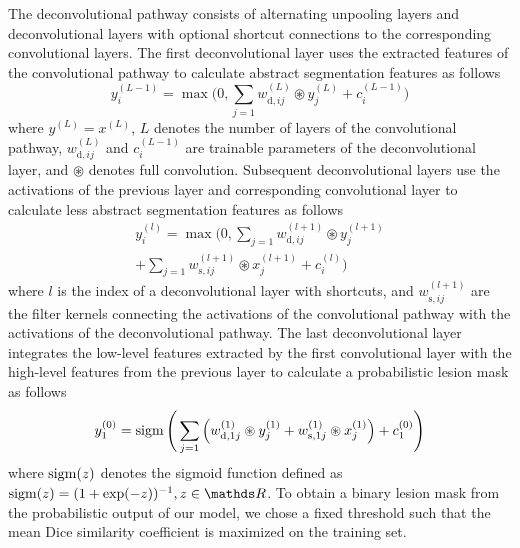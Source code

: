 The deconvolutional pathway consists of alternating unpooling layers and
deconvolutional layers with optional shortcut connections to the corresponding
convolutional layers. The first deconvolutional layer uses the extracted
features of the convolutional pathway to calculate abstract segmentation
features as follows
\begin{equation}
y^{(L-1)}_i = \max\Bigg(0, \sum_{j=1}w^{(L)}_{\text{d},ij}\circledast
y^{(L)}_j + c^{(L-1)}_{i}\Bigg)
\end{equation}
where $y^{(L)} = x^{(L)}$, $L$ denotes the number of layers of the convolutional
pathway, $w^{(L)}_{\text{d},ij}$ and $c^{(L-1)}_i$ are trainable parameters of
the deconvolutional layer, and $\circledast$ denotes full convolution. Subsequent
deconvolutional layers use the activations of the previous layer
and corresponding convolutional layer to calculate less abstract segmentation
features as follows
\begin{multline}
y^{(l)}_i = \max\Bigg(0, 
\sum_{j=1}w^{(l+1)}_{\text{d},ij}\circledast y^{(l+1)}_j\\
+ \sum_{j=1} w^{(l+1)}_{\text{s},ij}\circledast x^{(l+1)}_j +
c^{(l)}_i\Bigg)
\end{multline}
where $l$ is the index of a deconvolutional layer with shortcuts, and
$w^{(l+1)}_{\text{s},ij}$ are the filter kernels connecting the activations of
the convolutional pathway with the activations of the deconvolutional pathway.
The last deconvolutional layer integrates the low-level features extracted by
the first convolutional layer with the high-level features from the previous
layer to calculate a probabilistic lesion mask as follows
\begin{equation}
y^{(0)}_1 = \operatorname{sigm}\Bigg(\sum_{j=1}\Big(w^{(1)}_{\text{d},1j}\circledast
y^{(1)}_j +
w^{(1)}_{\text{s},1j}\circledast x^{(1)}_j\Big) + c^{(0)}_1\Bigg)
\end{equation}
where $\operatorname{sigm}(z)$ denotes the sigmoid function defined as $\sigm(z) = (1 +
\exp(-z))^{-1}, z \in \R$. To obtain a binary lesion mask from the probabilistic
output of our model, we chose a fixed threshold such that the mean Dice
similarity coefficient is maximized on the training set.

